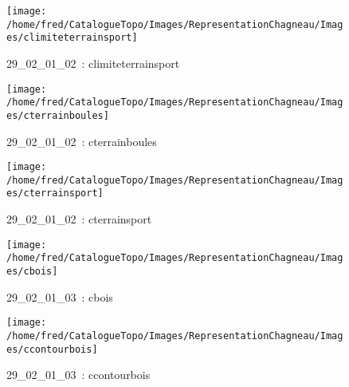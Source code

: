 \documentclass[12pt,titlepage]{book}
\begin{document}
\begin{figure}[h!]
  \begin{minipage}[t]{3cm}
    \begin{center}
      \texttt{[image: /home/fred/CatalogueTopo/Images/RepresentationChagneau/Images/climiteterrainsport]}
      \caption[~29\_02\_01\_02]{\small{29\_02\_01\_02~:} \tiny{climiteterrainsport}}\label{climiteterrainsport}
    \end{center}
  \end{minipage}
  \begin{minipage}[t]{3cm}
    \begin{center}
      \texttt{[image: /home/fred/CatalogueTopo/Images/RepresentationChagneau/Images/cterrainboules]}
      \caption[~29\_02\_01\_02]{\small{29\_02\_01\_02~:} \tiny{cterrainboules}}\label{cterrainboules}
    \end{center}
  \end{minipage}
  \begin{minipage}[t]{3cm}
    \begin{center}
      \texttt{[image: /home/fred/CatalogueTopo/Images/RepresentationChagneau/Images/cterrainsport]}
      \caption[~29\_02\_01\_02]{\small{29\_02\_01\_02~:} \tiny{cterrainsport}}\label{cterrainsport}
    \end{center}
  \end{minipage}
  \begin{minipage}[t]{3cm}
    \begin{center}
      \texttt{[image: /home/fred/CatalogueTopo/Images/RepresentationChagneau/Images/cbois]}
      \caption[~29\_02\_01\_03]{\small{29\_02\_01\_03~:} \tiny{cbois}}\label{cbois}
    \end{center}
  \end{minipage}
  \begin{minipage}[t]{3cm}
    \begin{center}
      \texttt{[image: /home/fred/CatalogueTopo/Images/RepresentationChagneau/Images/ccontourbois]}
      \caption[~29\_02\_01\_03]{\small{29\_02\_01\_03~:} \tiny{ccontourbois}}\label{ccontourbois}
    \end{center}
  \end{minipage}
  \begin{minipage}[t]{3cm}
    \begin{center}

\end{center}
\end{minipage}
\end{figure}
\end{document}
